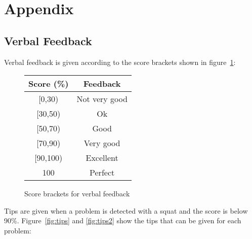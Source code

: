 \section{Appendix}

\subsection{Verbal Feedback}
\label{sec:appendix_feedback}

Verbal feedback is given according to the score brackets shown in figure~\ref{fig:score_brackets}:

\begin{figure}[H]
    \centering
	\begin{tabular}{ | c | c | }
		\hline
	    \textbf{Score (\%)} & \textbf{Feedback}\\ \hline
	    [0,30) & Not very good \\ \hline
		[30,50) & Ok \\ \hline
		[50,70) & Good \\ \hline
		[70,90) & Very good \\ \hline
		[90,100) & Excellent \\ \hline
		100 & Perfect \\ \hline
	\end{tabular}
\caption{Score brackets for verbal feedback}
\label{fig:score_brackets}
\end{figure}

Tips are given when a problem is detected with a squat and the score is below 90\%. Figure~\ref{fig:tips} and \ref{fig:tips2} show the tips that can be given for each problem:

